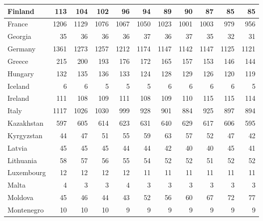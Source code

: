 \begin{table}
\begin{tabular}{|l|r|r|r|r|r|r|r|r|r|r|}
                       Finland&    113&    104&    102&     96&     94&     89&     90&     87&     85&     85\\\hline
                        France&   1206&   1129&   1076&   1067&   1050&   1023&   1001&   1003&    979&    956\\\hline
                       Georgia&     35&     36&     36&     36&     37&     36&     37&     35&     32&     31\\\hline
                       Germany&   1361&   1273&   1257&   1212&   1174&   1147&   1142&   1147&   1125&   1121\\\hline
                        Greece&    215&    200&    193&    176&    172&    165&    157&    153&    146&    144\\\hline
                       Hungary&    132&    135&    136&    133&    124&    128&    129&    126&    120&    119\\\hline
                       Iceland&      6&      6&      5&      5&      5&      6&      6&      6&      6&      5\\\hline
                       Ireland&    111&    108&    109&    111&    108&    109&    110&    115&    115&    114\\\hline
                         Italy&   1117&   1026&   1030&    999&    928&    901&    884&    925&    897&    894\\\hline
                    Kazakhstan&    597&    605&    614&    623&    631&    640&    629&    617&    606&    595\\\hline
                    Kyrgyzstan&     44&     47&     51&     55&     59&     63&     57&     52&     47&     42\\\hline
                        Latvia&     45&     45&     45&     44&     44&     42&     40&     40&     45&     41\\\hline
                     Lithuania&     58&     57&     56&     55&     54&     52&     52&     51&     52&     52\\\hline
                    Luxembourg&     12&     12&     12&     12&     11&     11&     11&     11&     11&     11\\\hline
                         Malta&      4&      3&      3&      4&      3&      3&      3&      3&      3&      3\\\hline
                       Moldova&     45&     46&     44&     43&     52&     56&     60&     67&     72&     77\\\hline
                    Montenegro&     10&     10&     10&      9&      9&      9&      9&      9&      9&      9\\\hline

\end{tabular}
\end{table}
